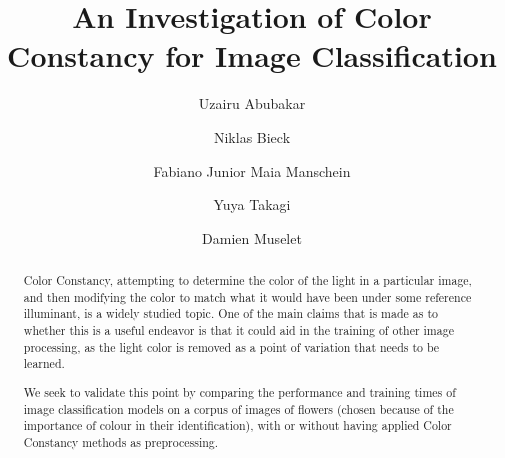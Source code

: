 \documentclass[runningheads]{llncs}
\begin{document}
\title{An Investigation of Color Constancy for Image Classification}

\author{
    Uzairu Abubakar \and 
    Niklas Bieck \and 
    Fabiano Junior {Maia Manschein} \and 
    Yuya Takagi \and 
    Damien Muselet
}




\maketitle

\begin{abstract}
Color Constancy, attempting to determine the color of the light in a particular image, and then 
modifying the color to match what it would have been under some reference illuminant, is a widely studied topic.
One of the main claims that is made as to whether this is a useful endeavor is that it could aid in the training
of other image processing, as the light color is removed as a point of variation that needs to be learned.

We seek to validate this point by comparing the performance and training times of image classification models on 
a corpus of images of flowers (chosen because of the importance of colour in their identification), with or without
having applied Color Constancy methods as preprocessing.
\end{abstract}



\end{document}
